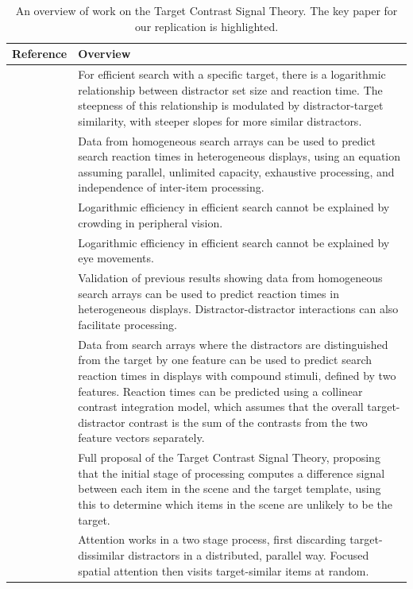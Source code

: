 \documentclass[smallextended, natbib]{svjour3}       %
\begin{document}
\begin{table}[h]
\centering
\begin{tabularx}{\textwidth}{lX}
Reference & Overview\\
 \hline 
\cite{buetti2016towards} & For efficient search with a specific target, there is a logarithmic relationship between distractor set size and reaction time. The steepness of this relationship is modulated by distractor-target similarity, with steeper slopes for more similar distractors.\\
\cite{wang2017predicting} & Data from homogeneous search arrays can be used to predict search reaction times in heterogeneous displays, using an equation assuming parallel, unlimited capacity, exhaustive processing, and independence of inter-item processing. \\ 
\cite{madison2018role} & Logarithmic efficiency in efficient search cannot be explained by crowding in peripheral vision. \\
\cite{ng2018fixed} & Logarithmic efficiency in efficient search cannot be explained by eye movements. \\
\cite{lleras2019predicting} & Validation of previous results showing data from homogeneous search arrays can be used to predict reaction times in heterogeneous displays. Distractor-distractor interactions can also facilitate processing. \\
\textbf{\cite{buetti2019predicting}} & Data from search arrays where the distractors are distinguished from the target by one feature can be used to predict search reaction times in displays with compound stimuli, defined by two features. Reaction times can be predicted using a collinear contrast integration model, which assumes that the overall target-distractor contrast is the sum of the contrasts from the two feature vectors separately. \\
\cite{lleras2020target} & Full proposal of the Target Contrast Signal Theory, proposing that the initial stage of processing computes a difference signal between each item in the scene and the target template, using this to determine which items in the scene are unlikely to be the target. \\
\cite{ng2020prioritization} & Attention works in a two stage process, first discarding target-dissimilar distractors in a distributed, parallel way. Focused spatial attention then visits target-similar items at random. \\
\end{tabularx}
\caption{An overview of work on the Target Contrast Signal Theory. The key paper for our replication is highlighted.}
\label{tab:tcs_overview}
\end{table}
\end{document}

